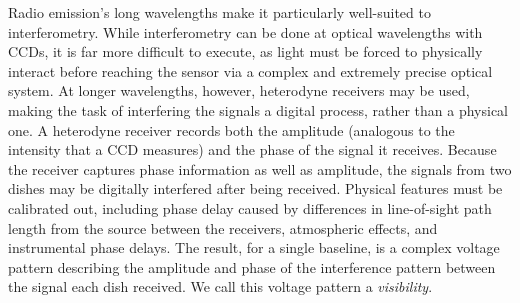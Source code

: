 


Radio emission's long wavelengths make it particularly well-suited to interferometry. While interferometry can be done at optical wavelengths with CCDs, it is far more difficult to execute, as light must be forced to physically interact before reaching the sensor via a complex and extremely precise optical system. At longer wavelengths, however, heterodyne receivers may be used, making the task of interfering the signals a digital process, rather than a physical one. A heterodyne receiver records both the amplitude (analogous to the intensity that a CCD measures) and the phase of the signal it receives. Because the receiver captures phase information as well as amplitude, the signals from two dishes may be digitally interfered after being received. Physical features must be calibrated out, including phase delay caused by differences in line-of-sight path length from the source between the receivers, atmospheric effects, and instrumental phase delays. The result, for a single baseline, is a complex voltage pattern describing the amplitude and phase of the interference pattern between the signal each dish received. We call this voltage pattern a \textit{visibility}.




